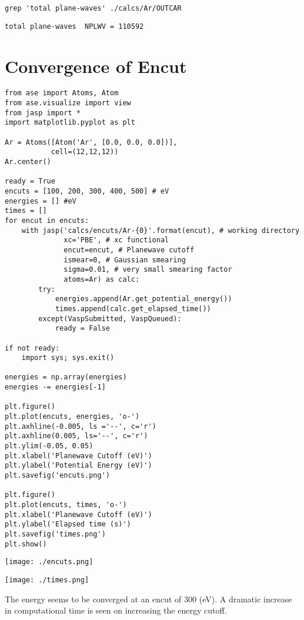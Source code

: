 \documentclass[11pt]{article}
\begin{document}
\begin{verbatim}
grep 'total plane-waves' ./calcs/Ar/OUTCAR
\end{verbatim}

\begin{verbatim}
total plane-waves  NPLWV = 110592
\end{verbatim}



\section{Convergence of Encut}
\label{sec-2}

\begin{verbatim}
from ase import Atoms, Atom
from ase.visualize import view
from jasp import *
import matplotlib.pyplot as plt

Ar = Atoms([Atom('Ar', [0.0, 0.0, 0.0])],
           cell=(12,12,12))
Ar.center()

ready = True
encuts = [100, 200, 300, 400, 500] # eV
energies = [] #eV
times = []
for encut in encuts:
    with jasp('calcs/encuts/Ar-{0}'.format(encut), # working directory
              xc='PBE', # xc functional
              encut=encut, # Planewave cutoff
              ismear=0, # Gaussian smearing
              sigma=0.01, # very small smearing factor
              atoms=Ar) as calc:
        try:
            energies.append(Ar.get_potential_energy())
            times.append(calc.get_elapsed_time())
        except(VaspSubmitted, VaspQueued):
            ready = False

if not ready:
    import sys; sys.exit()

energies = np.array(energies)
energies -= energies[-1]

plt.figure()
plt.plot(encuts, energies, 'o-')
plt.axhline(-0.005, ls ='--', c='r')
plt.axhline(0.005, ls='--', c='r')
plt.ylim(-0.05, 0.05) 
plt.xlabel('Planewave Cutoff (eV)')
plt.ylabel('Potential Energy (eV)')
plt.savefig('encuts.png')

plt.figure()
plt.plot(encuts, times, 'o-')
plt.xlabel('Planewave Cutoff (eV)')
plt.ylabel('Elapsed time (s)')
plt.savefig('times.png')
plt.show()
\end{verbatim}

\texttt{[image: ./encuts.png]}

\texttt{[image: ./times.png]}

The energy seems to be converged at an encut of 300 (eV). A dramatic increase in computational time is seen on increasing the energy cutoff.
\end{document}
